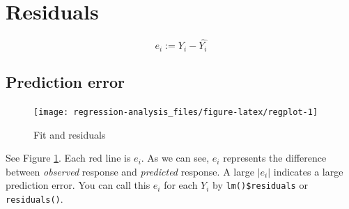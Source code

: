 \documentclass[]{book}
\newenvironment{Shaded}{\begin{snugshade}}{\end{snugshade}}
\newcommand{\DataTypeTok}[1]{\textcolor[rgb]{0.13,0.29,0.53}{#1}}
\newcommand{\FloatTok}[1]{\textcolor[rgb]{0.00,0.00,0.81}{#1}}
\newcommand{\KeywordTok}[1]{\textcolor[rgb]{0.13,0.29,0.53}{\textbf{#1}}}
\newcommand{\NormalTok}[1]{#1}
\newcommand{\OperatorTok}[1]{\textcolor[rgb]{0.81,0.36,0.00}{\textbf{#1}}}
\newcommand{\OtherTok}[1]{\textcolor[rgb]{0.56,0.35,0.01}{#1}}
\newcommand{\StringTok}[1]{\textcolor[rgb]{0.31,0.60,0.02}{#1}}
\theoremstyle{definition}
\theoremstyle{definition}
\theoremstyle{definition}
\theoremstyle{remark}
\let\BeginKnitrBlock\begin \let\EndKnitrBlock\end
\begin{document}
\hypertarget{residuals}{%
\section{Residuals}\label{residuals}}

\BeginKnitrBlock{definition}[Residuals]
\protect\hypertarget{def:res}{}{\label{def:res} {} }\[e_i := Y_i - \hat{Y_i}\]
\EndKnitrBlock{definition}

\hypertarget{prediction-error}{%
\subsection{Prediction error}\label{prediction-error}}

\begin{Shaded}
\end{Shaded}

\begin{figure}[H]

{\centering \texttt{[image: regression-analysis\_files/figure-latex/regplot-1]} 

}

\caption{Fit and residuals}\label{fig:regplot}
\end{figure}

See Figure \ref{fig:regplot}. Each red line is \(e_i\). As we can see, \(e_i\) represents the difference between \emph{observed} response and \emph{predicted} response. A large \(\lvert e_i \rvert\) indicates a large prediction error. You can call this \(e_i\) for each \(Y_i\) by \texttt{lm()\$residuals} or \texttt{residuals()}.
\end{document}
